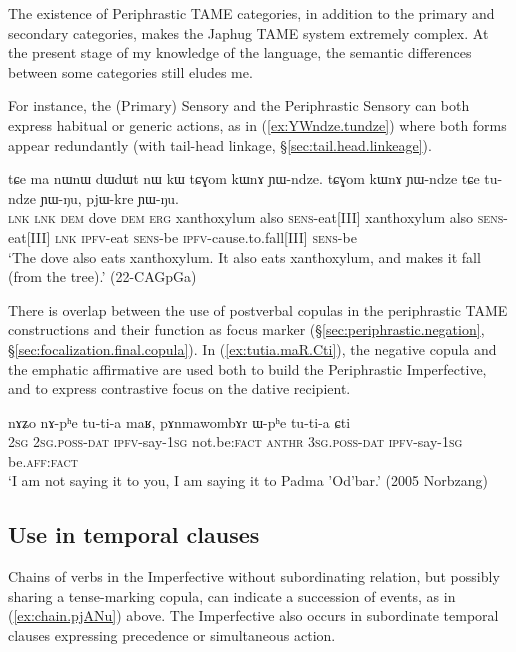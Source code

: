 The existence of Periphrastic TAME categories, in addition to the primary and secondary categories, makes the Japhug TAME system extremely complex. At the present stage of my knowledge of the language, the semantic differences between some categories still eludes me.

For instance, the (Primary) Sensory and the Periphrastic Sensory can both express habitual or generic actions, as in (\ref{ex:YWndze.tundze}) where both forms appear redundantly (with tail-head linkage, §\ref{sec:tail.head.linkeage}).

\begin{exe}
\ex \label{ex:YWndze.tundze}
\gll tɕe ma nɯnɯ dɯdɯt nɯ kɯ tɕɣom kɯnɤ ɲɯ-ndze. tɕɣom kɯnɤ ɲɯ-ndze tɕe tu-ndze ɲɯ-ŋu, pjɯ-kre ɲɯ-ŋu. \\
\textsc{lnk} \textsc{lnk} \textsc{dem} dove \textsc{dem} \textsc{erg} xanthoxylum also \textsc{sens}-eat[III]  xanthoxylum also \textsc{sens}-eat[III] \textsc{lnk} \textsc{ipfv}-eat \textsc{sens}-be \textsc{ipfv}-cause.to.fall[III] \textsc{sens}-be \\
\glt `The dove also eats xanthoxylum. It also eats xanthoxylum, and makes it fall (from the tree).' (22-CAGpGa)
\end{exe}

There is overlap between the use of postverbal copulas in the periphrastic TAME constructions and their function as focus marker (§\ref{sec:periphrastic.negation}, §\ref{sec:focalization.final.copula}). In (\ref{ex:tutia.maR.Cti}), the negative copula  and the emphatic affirmative  are used both to build the Periphrastic Imperfective, and to express contrastive focus on the dative recipient.


\begin{exe}
\ex \label{ex:tutia.maR.Cti}
\gll nɤʑo nɤ-pʰe tu-ti-a maʁ, pɤnmawombɤr ɯ-pʰe tu-ti-a ɕti \\
\textsc{2sg} \textsc{2sg}.\textsc{poss}-\textsc{dat} \textsc{ipfv}-say-\textsc{1sg} not.be:\textsc{fact}  \textsc{anthr} \textsc{3sg}.\textsc{poss}-\textsc{dat}  \textsc{ipfv}-say-\textsc{1sg} be.\textsc{aff}:\textsc{fact} \\
\glt `I am not saying it to you, I am saying it to Padma 'Od'bar.' (2005 Norbzang)
\end{exe}

\subsection{Use in temporal clauses} \label{sec:ipfv.temporal}
Chains of verbs in the Imperfective without subordinating relation, but possibly sharing a tense-marking copula, can indicate a succession of events, as in (\ref{ex:chain.pjANu}) above. The Imperfective also occurs in subordinate temporal clauses expressing precedence or simultaneous action.

